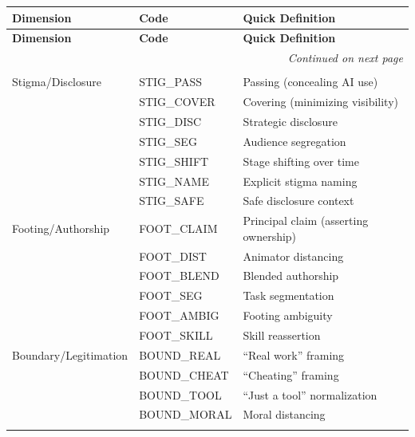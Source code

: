 \documentclass[11pt]{article}
\begin{document}
\small
\begin{longtable}{@{}p{3cm}p{3cm}p{8.5cm}@{}}
\toprule
\textbf{Dimension} & \textbf{Code} & \textbf{Quick Definition} \\
\midrule
\endfirsthead
\toprule
\textbf{Dimension} & \textbf{Code} & \textbf{Quick Definition} \\
\midrule
\endhead
\midrule
\multicolumn{3}{r}{\textit{Continued on next page}} \\
\endfoot
\bottomrule
\endlastfoot

\multicolumn{3}{l}{\textbf{\textit{Primary: Interactional Dynamics}}} \\
\midrule
\rowcolor{stigmacolor!20}
Stigma/Disclosure & STIG\_PASS & Passing (concealing AI use) \\
\rowcolor{stigmacolor!20}
& STIG\_COVER & Covering (minimizing visibility) \\
\rowcolor{stigmacolor!20}
& STIG\_DISC & Strategic disclosure \\
\rowcolor{stigmacolor!20}
& STIG\_SEG & Audience segregation \\
\rowcolor{stigmacolor!20}
& STIG\_SHIFT & Stage shifting over time \\
\rowcolor{stigmacolor!20}
& STIG\_NAME & Explicit stigma naming \\
\rowcolor{stigmacolor!20}
& STIG\_SAFE & Safe disclosure context \\
\midrule
\rowcolor{footingcolor!20}
Footing/Authorship & FOOT\_CLAIM & Principal claim (asserting ownership) \\
\rowcolor{footingcolor!20}
& FOOT\_DIST & Animator distancing \\
\rowcolor{footingcolor!20}
& FOOT\_BLEND & Blended authorship \\
\rowcolor{footingcolor!20}
& FOOT\_SEG & Task segmentation \\
\rowcolor{footingcolor!20}
& FOOT\_AMBIG & Footing ambiguity \\
\rowcolor{footingcolor!20}
& FOOT\_SKILL & Skill reassertion \\
\midrule
\rowcolor{boundarycolor!20}
Boundary/Legitimation & BOUND\_REAL & ``Real work'' framing \\
\rowcolor{boundarycolor!20}
& BOUND\_CHEAT & ``Cheating'' framing \\
\rowcolor{boundarycolor!20}
& BOUND\_TOOL & ``Just a tool'' normalization \\
\rowcolor{boundarycolor!20}
& BOUND\_MORAL & Moral distancing \\
\rowcolor{boundarycolor!20}

\end{longtable}
\end{document}
